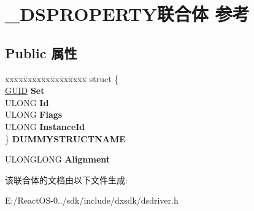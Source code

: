 \hypertarget{union___d_s_p_r_o_p_e_r_t_y}{}\section{\+\_\+\+D\+S\+P\+R\+O\+P\+E\+R\+T\+Y联合体 参考}
\label{union___d_s_p_r_o_p_e_r_t_y}
\subsection*{Public 属性}
\begin{DoxyCompactItemize}
\item 
\mbox{\label{union___d_s_p_r_o_p_e_r_t_y_a2099d929bc2644ce2ee5e051c56dbeb0}} 
\begin{tabbing}
xx\=xx\=xx\=xx\=xx\=xx\=xx\=xx\=xx\=\kill
struct \{\\
\>\hyperlink{interface_g_u_i_d}{GUID} {\bfseries Set}\\
\>ULONG {\bfseries Id}\\
\>ULONG {\bfseries Flags}\\
\>ULONG {\bfseries InstanceId}\\
\} {\bfseries DUMMYSTRUCTNAME}\\

\end{tabbing}\item 
\mbox{\label{union___d_s_p_r_o_p_e_r_t_y_af968e620208b0723ed7ee7ab3e406ef8}} 
U\+L\+O\+N\+G\+L\+O\+NG {\bfseries Alignment}
\end{DoxyCompactItemize}


该联合体的文档由以下文件生成\+:\begin{DoxyCompactItemize}
\item 
E\+:/\+React\+O\+S-\/0../sdk/include/dxsdk/dsdriver.\+h\end{DoxyCompactItemize}
